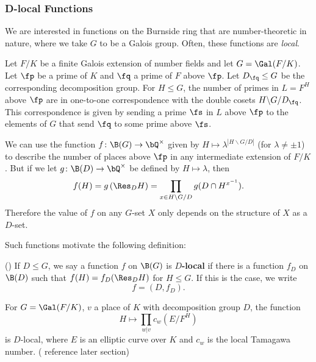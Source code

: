 \subsubsection{D-local Functions}\label{D-loc}

We are interested in functions on the Burnside ring that are number-theoretic in nature, where we take $G$ to be a Galois group. Often, these functions are \textit{local}. 

\begin{example}
Let $F / K$ be a finite Galois extension of number fields and let $G = \Gal(F / K)$. Let $\fp$ be a prime of $K$ and $\fq$ a prime of $F$ above $\fp$. Let $D_{\fq} \leq G$ be the corresponding decomposition group. For $H \leq G$, the number of primes in $L = F^{H}$ above $\fp$ are in one-to-one correspondence with the double cosets $H \backslash G / D_{\fq}$. This correspondence is given by sending a prime $\fs$ in $L$ above $\fp$ to the elements of $G$ that send $\fq$ to some prime above $\fs$.

We can use the function $f \colon \B(G) \to \bQ^{\times}$ given by $H \mapsto  \lambda^{| H \backslash G / D|}$ (for $\lambda \not= \pm 1$) to describe the number of places above $\fp$ in any intermediate extension of $F / K$. But if we let $g \colon \B(D) \to \bQ^{\times}$ be defined by $H \mapsto \lambda$, then 
        \[ f(H) = g\left(\Res_D H\right) = \prod_{x \in H \backslash G / D} g(D \cap H^{x^{-1}}) .\]
Therefore the value of $f$ on any $G$-set $X$ only depends on the structure of $X$ as a $D$-set.
\end{example}

Such functions motivate the following definition:

\begin{defn}(\cite[Definition 2.33]{reg-const})\label{D-loc-fn}
    If $D \leq G$, we say a function $f$ on $\B(G)$ is \textbf{$D$-local} if there is a function $f_D$ on $\B(D)$ such that $f(H) = f_D(\Res_D H)$ for $H \leq G$.
    If this is the case, we write
    \[ f = (D, f_D). \]
\end{defn}

\begin{example}\label{tama-ex}
    For $G = \Gal(F / K)$, $v$ a place of $K$ with decomposition group $D$, the function
    \[ H \mapsto \prod_{w | v} c_w(E / F^{H}) \]
    is $D$-local, where $E$ is an elliptic curve over $K$ and $c_w$ is the local Tamagawa number. ({\color{red} reference later section})
\end{example}

